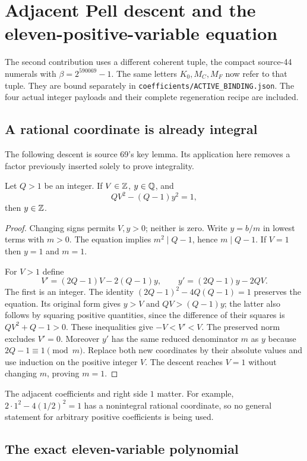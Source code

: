 \section{Adjacent Pell descent and the eleven-positive-variable equation}
\label{sec:positive11}

The second contribution uses a different coherent tuple, the compact
source-44 numerals with $\beta=2^{590069}-1$. The same letters
$K_0,M_C,M_F$ now refer to that tuple. They are bound separately in
\texttt{coefficients/ACTIVE\_BINDING.json}. The four actual integer
payloads and their complete regeneration recipe are included.

\subsection{A rational coordinate is already integral}

The following descent is source 69's key lemma. Its application here
removes a factor previously inserted solely to prove integrality.

\begin{lemma}
\label{lem:descent}
Let $Q>1$ be an integer. If $V\in\mathbb Z$, $y\in\mathbb Q$, and
\[
 QV^2-(Q-1)y^2=1,
\]
then $y\in\mathbb Z$.
\end{lemma}
\begin{proof}
Changing signs permits $V,y>0$; neither is zero. Write $y=b/m$ in
lowest terms with $m>0$. The equation implies $m^2\mid Q-1$, hence
$m\mid Q-1$. If $V=1$ then $y=1$ and $m=1$.

For $V>1$ define
\[
 V'=(2Q-1)V-2(Q-1)y,\qquad
 y'=(2Q-1)y-2QV.
\]
The first is an integer. The identity
$(2Q-1)^2-4Q(Q-1)=1$ preserves the equation. Its original form gives
$y>V$ and $QV>(Q-1)y$; the latter also follows by squaring positive
quantities, since the difference of their squares is $QV^2+Q-1>0$.
These inequalities give $-V<V'<V$. The preserved norm excludes $V'=0$.
Moreover $y'$ has the same reduced denominator $m$ as $y$ because
$2Q-1\equiv1\pmod m$. Replace both new coordinates by their absolute
values and use induction on the positive integer $V$. The descent reaches
$V=1$ without changing $m$, proving $m=1$.
\end{proof}

The adjacent coefficients and right side $1$ matter. For example,
$2\cdot1^2-4(1/2)^2=1$ has a nonintegral rational coordinate, so no
general statement for arbitrary positive coefficients is being used.

\subsection{The exact eleven-variable polynomial}


